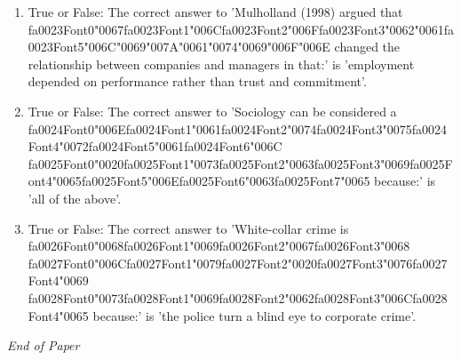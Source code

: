 \documentclass[12pt]{article}
\begin{document}
\begin{enumerate}[label=\arabic*.]
\item True or False: The correct answer to 'Mulholland (1998) argued that {\csname fa0023Font0\endcsname\char"0067}{\csname fa0023Font1\endcsname\char"006C}{\csname fa0023Font2\endcsname\char"006F}{\csname fa0023Font3\endcsname\char"0062}{\char"0061}{\csname fa0023Font5\endcsname\char"006C}{\char"0069}{\char"007A}{\char"0061}{\char"0074}{\char"0069}{\char"006F}{\char"006E} changed the relationship between companies and managers in that:' is 'employment depended on performance rather than trust and commitment'.
\item True or False: The correct answer to 'Sociology can be considered a {\csname fa0024Font0\endcsname\char"006E}{\csname fa0024Font1\endcsname\char"0061}{\csname fa0024Font2\endcsname\char"0074}{\csname fa0024Font3\endcsname\char"0075}{\csname fa0024Font4\endcsname\char"0072}{\csname fa0024Font5\endcsname\char"0061}{\csname fa0024Font6\endcsname\char"006C} {\csname fa0025Font0\endcsname\char"0020}{\csname fa0025Font1\endcsname\char"0073}{\csname fa0025Font2\endcsname\char"0063}{\csname fa0025Font3\endcsname\char"0069}{\csname fa0025Font4\endcsname\char"0065}{\csname fa0025Font5\endcsname\char"006E}{\csname fa0025Font6\endcsname\char"0063}{\csname fa0025Font7\endcsname\char"0065} because:' is 'all of the above'.
\item True or False: The correct answer to 'White-collar crime is {\csname fa0026Font0\endcsname\char"0068}{\csname fa0026Font1\endcsname\char"0069}{\csname fa0026Font2\endcsname\char"0067}{\csname fa0026Font3\endcsname\char"0068} {\csname fa0027Font0\endcsname\char"006C}{\csname fa0027Font1\endcsname\char"0079}{\csname fa0027Font2\endcsname\char"0020}{\csname fa0027Font3\endcsname\char"0076}{\csname fa0027Font4\endcsname\char"0069} {\csname fa0028Font0\endcsname\char"0073}{\csname fa0028Font1\endcsname\char"0069}{\csname fa0028Font2\endcsname\char"0062}{\csname fa0028Font3\endcsname\char"006C}{\csname fa0028Font4\endcsname\char"0065} because:' is 'the police turn a blind eye to corporate crime'.
\end{enumerate}

\vfill
\noindent\textit{End of Paper}
\end{document}
